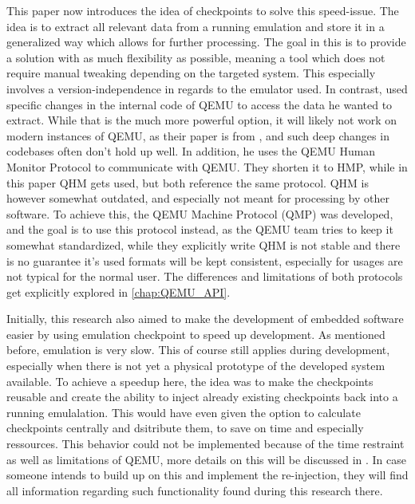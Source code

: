 This paper now introduces the idea of checkpoints to solve this speed-issue.
The idea is to extract all relevant data from a running emulation
and store it in a generalized way which allows for further processing.
The goal in this is to provide a solution with as much flexibility as possible,
meaning a tool which does not require manual tweaking depending on the targeted system.
This especially involves a version-independence in regards to the emulator used.
In contrast,  used specific changes in the internal code of QEMU
to access the data he wanted to extract.
While that is the much more powerful option, it will likely not work on modern instances of QEMU,
as their paper is from \citeyear{kitcheckpoints}, and such deep changes in codebases often don't hold up well.
In addition, he uses the QEMU Human Monitor Protocol to communicate with QEMU.
They shorten it to HMP, while in this paper QHM gets used, but both reference the same protocol.
QHM is however somewhat outdated, and especially not meant for processing by other software.
To achieve this, the QEMU Machine Protocol (QMP) was developed, and the goal is to use this protocol instead,
as the QEMU team tries to keep it somewhat standardized,
while they explicitly write QHM is not stable and there is no guarantee it's used formats will be kept consistent,
especially for usages are not typical for the normal user.
The differences and limitations of both protocols get explicitly explored in \autoref{chap:QEMU_API}.

Initially, this research also aimed to make the development of embedded software easier by using emulation checkpoint to speed up development.
As mentioned before, emulation is very slow.
This of course still applies during development, especially when there is not yet a physical prototype of the developed system available.
To achieve a speedup here, the idea was to make the checkpoints reusable
and create the ability to inject already existing checkpoints back into a running emulalation.
This would have even given the option to calculate checkpoints centrally and dsitribute them,
to save on time and especially ressources.
This behavior could not be implemented because of the time restraint as well as limitations of QEMU,
more details on this will be discussed in .
In case someone intends to build up on this and implement the re-injection,
they will find all information regarding such functionality found during this research there.
